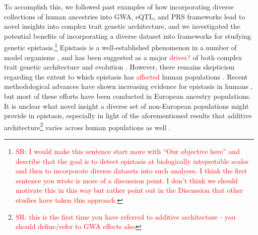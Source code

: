 \documentclass[12pt,a4paper]{article}
\newcommand{\red}[1]{\textcolor{red}{#1}}
\begin{document}
To accomplish this, we followed past examples of how incorporating diverse collections of human ancestries into GWA, eQTL, and PRS frameworks lead to novel insights into complex trait genetic architecture, and we investigated the potential benefits of incorporating a diverse dataset into frameworks for studying genetic epistasis.\footnote{\red{SR: I would make this sentence start more with ``Our objective here'' and describe that the goal is to detect epistasis at biologically intepretable scales and then to incorporate diverse datasets into such analyses. I think the first sentence you wrote is more of a discussion point. I don't think we should motivate this in this way but rather point out in the Discussion that other studies have taken this approach.}} Epistasis is a well-established phenomenon in a number of model organisms \citep{Lehner2006,Rowe2008,Shao2008,Flint2009,Costanzo2010,He2010,Jarvis2011,Pettersson2011,Bloom2013,Monnahan2015}, and has been suggested as a major \red{driver?} of both complex trait genetic architecture and evolution \citep{Carlborg2004,Carlborg2006,Martin2007,Phillips2008,Moore2009,Jones2014,Mackay2014}. However, there remains skepticism regarding the extent to which epistasis has \red{affected} human populations \citep{Hill2008,Crow2010,Aschard2012,Wood2014,Yang2015}. Recent methodological advances have shown increasing evidence for epistasis in humans \citep{Verma2016,Crawford2017a,Fang2019,Runcie2019}, but most of these efforts have been conducted in European ancestry populations. It is unclear what novel insight a diverse set of non-European populations might provide in epistasis, especially in light of the aforementioned results that additive architecture\footnote{\red{SR: this is the first time you have referred to additive architecture - you should define/refer to GWA effects also}} varies across human populations as well \citep{Dumitrescu2011,Carlson2013,Kuchenbaecker2019,Wojcik2019}.
\end{document}
